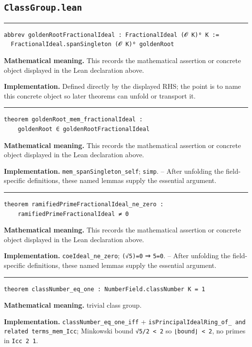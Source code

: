\documentclass[UTF8,a4paper,11pt,fontset=fandol]{ctexart}
\theoremstyle{definition}
\newcommand{\statementsep}{\par\medskip\hrule\medskip}
\begin{document}
\subsection{\texttt{ClassGroup.lean}}

\statementsep
\begin{verbatim}
abbrev goldenRootFractionalIdeal : FractionalIdeal (𝓞 K)⁰ K :=
  FractionalIdeal.spanSingleton (𝓞 K)⁰ goldenRoot
\end{verbatim}
\noindent\textbf{Mathematical meaning.} This records the mathematical assertion or concrete object displayed in the Lean declaration above.\par
\noindent\textbf{Implementation.} Defined directly by the displayed RHS; the point is to name this concrete object so later theorems can unfold or transport it.\par
\statementsep
\begin{verbatim}
theorem goldenRoot_mem_fractionalIdeal :
    goldenRoot ∈ goldenRootFractionalIdeal
\end{verbatim}
\noindent\textbf{Mathematical meaning.} This records the mathematical assertion or concrete object displayed in the Lean declaration above.\par
\noindent\textbf{Implementation.} \texttt{mem\_\allowbreak{}spanSingleton\_\allowbreak{}self}; \texttt{simp}. -- After unfolding the field-specific definitions, these named lemmas supply the essential argument.\par
\statementsep
\begin{verbatim}
theorem ramifiedPrimeFractionalIdeal_ne_zero :
    ramifiedPrimeFractionalIdeal ≠ 0
\end{verbatim}
\noindent\textbf{Mathematical meaning.} This records the mathematical assertion or concrete object displayed in the Lean declaration above.\par
\noindent\textbf{Implementation.} \texttt{coeIdeal\_\allowbreak{}ne\_\allowbreak{}zero}; \texttt{(√5)=0} ⇒ \texttt{5=0}. -- After unfolding the field-specific definitions, these named lemmas supply the essential argument.\par
\statementsep
\begin{verbatim}
theorem classNumber_eq_one : NumberField.classNumber K = 1
\end{verbatim}
\noindent\textbf{Mathematical meaning.} trivial class group.\par
\noindent\textbf{Implementation.} \texttt{classNumber\_\allowbreak{}eq\_\allowbreak{}one\_\allowbreak{}iff} + \texttt{isPrincipalIdealRing\_\allowbreak{}of\_\allowbreak{} and related terms\_\allowbreak{}mem\_\allowbreak{}Icc}; Minkowski bound \texttt{√5/\allowbreak{}2 < 2} so \texttt{⌊bound⌋ < 2}, no primes in \texttt{Icc 2 1}.\par
\end{document}

